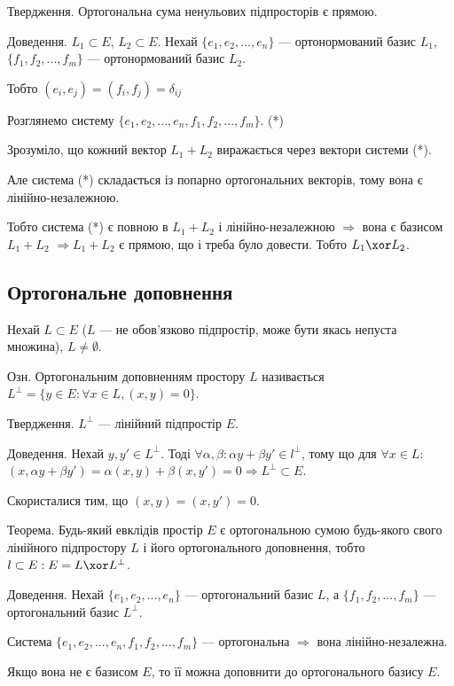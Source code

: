 Твердження.
Ортогональна сума ненульових підпросторів є прямою.

Доведення.
$L_1 \subset E$, $L_2 \subset E$.
Нехай $\{e_1, e_2, ..., e_n\}$ --- ортонормований базис $L_1$,
$\{f_1, f_2, ..., f_m\}$ --- ортонормований базис $L_2$.

Тобто $(e_i,e_j) = (f_i,f_j) = \delta_{ij}$

Розглянемо систему $\{e_1, e_2, ..., e_n, f_1, f_2, ..., f_m\}$. (*)

Зрозуміло, що кожний вектор $L_1 + L_2$ виражається через вектори системи (*).

Але система (*) складається із попарно ортогональних векторів, тому вона є
лінійно-незалежною.

Тобто система (*) є повною в $L_1 + L_2$ і лінійно-незалежною $\Rightarrow$ вона є базисом
$L_1 + L_2$ $\Rightarrow L_1 + L_2$ є прямою, що і треба було довести. Тобто $L_1 \xor L_2$.

\subsection*{Ортогональне доповнення}

Нехай $L \subset E$ ($L$ --- не обов’язково підпростір, може бути якась непуста
множина), $L \neq \emptyset$.

Озн. Ортогональним доповненням простору $L$ називається
$L^{\perp} = \{y \in E: \forall x \in L, (x, y) = 0\}$.

Твердження. $L^{\perp}$ --- лінійний підпростір $E$.

Доведення.
Нехай $y, y' \in L^{\perp}$. Тоді $\forall \alpha, \beta: \alpha y + \beta y' \in l^{\perp}$,
тому що для $\forall x \in L$:
$(x, \alpha y + \beta y') = \alpha(x,y) + \beta(x,y') = 0 \Rightarrow L^{\perp} \subset E$.

Скористалися тим, що $(x, y) = (x, y') = 0$.

Теорема. Будь-який евклідів простір $E$ є ортогональною сумою будь-якого
свого лінійного підпростору $L$ і його ортогонального доповнення, тобто
$l \subset E: E = L \xor L^{\perp}$.

Доведення.
Нехай $\{e_1, e_2, ..., e_n\}$ --- ортогональний базис $L$, а
$\{f_1, f_2, ..., f_m\}$ --- ортогональний базис $L^{\perp}$.

Система $\{e_1, e_2, ..., e_n, f_1, f_2, ..., f_m\}$ --- ортогональна $\Rightarrow$
вона лінійно-незалежна.

Якщо вона не є базисом $E$, то її можна доповнити до ортогонального базису $E$.

